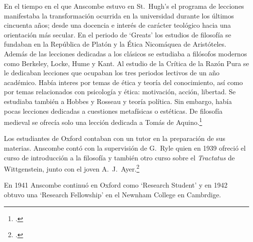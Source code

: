 En el tiempo en el que Anscombe estuvo en St.~Hugh's el programa de lecciones
manifestaba la transformación ocurrida en la universidad durante los últimos
cincuenta años; desde una docencia e interés de carácter teológico hacia una
orientación más secular. En el periodo de `Greats' los estudios de filosofía se
fundaban en la República de Platón y la Ética Nicomáquea de Aristóteles. Además
de las lecciones dedicadas a los clásicos se estudiaba a filósofos modernos como
Berkeley, Locke, Hume y Kant. Al estudio de la Crítica de la Razón Pura se le
dedicaban lecciones que ocupaban los tres periodos lectivos de un año académico.
Había interes por temas de ética y teoría del conocimiento, así como por temas
relacionados con psicología y ética: motivación, acción, libertad. Se estudiaba
también a Hobbes y Rosseau y teoría política. Sin embargo, había pocas lecciones
dedicadas a cuestiones metafísicas o estéticas. De filosofía medieval se ofrecía
solo una lección dedicada a Tomás de Aquino.\footcite[cf.~][pp.~23-24]{accint}

Los estudiantes de Oxford contaban con un tutor en la preparación de sus
materias. Anscombe contó con la supervisión de G.~Ryle quien en 1939 ofreció el
curso de introducción a la filosofía y también otro curso sobre el
\emph{Tractatus} de Wittgenstein, junto con el joven
A.~J.~Ayer.\footcite[cf.~][p.~24]{accint}


En 1941 Anscombe continuó en Oxford como `Research Student' y en 1942 obtuvo una
`Research Fellowship' en el Newnham College en Cambrdige.
